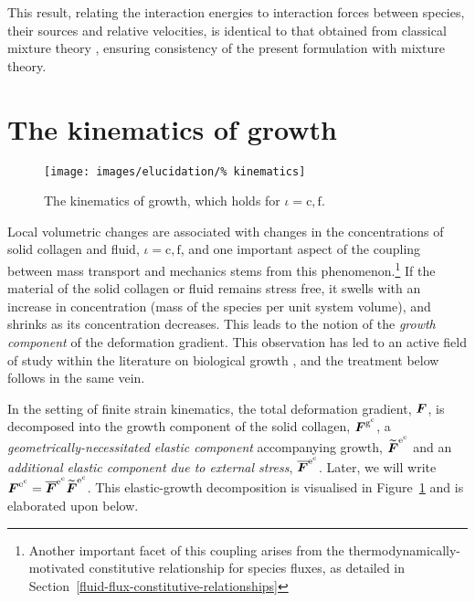 This result, relating the interaction energies to interaction
forces between species, their sources and relative velocities, is
identical to that obtained from classical mixture theory
\citep{TruesdellNoll:65}, ensuring consistency of the present
formulation with mixture theory.

\section{The kinematics of growth}
\label{kinematics-of-growth}

\begin{figure}[ht]
  \centering
  \texttt{[image: images/elucidation/\%
    kinematics]}
  \caption{The kinematics of growth, which holds for $\iota =
    \mathrm{c,f}$.} 
  \label{continuum-potato-growth-kinematics}
\end{figure}

Local volumetric changes are associated with changes in the
concentrations of solid collagen and fluid, $\iota = \mathrm{c,f}$,
and one important aspect of the coupling between mass transport and
mechanics stems from this phenomenon.\footnote{Another important facet
  of this coupling arises from the thermodynamically-motivated
  constitutive relationship for species fluxes, as detailed in
  Section~\ref{fluid-flux-constitutive-relationships}} If the material
of the solid collagen or fluid remains stress free, it swells with an
increase in concentration (mass of the species per unit system
volume), and shrinks as its concentration decreases. This leads to the
notion of the \emph{growth component} of the deformation
gradient. This observation has led to an active field of study within
the literature on biological growth \citep{Skalak:81, SkalakHoger:96,
  Klischetal:2001, TaberHumphrey:2001, LubardaHoger:02,
  AmbrosiMollica:2002}, and the treatment below follows in the same
vein.

In the setting of finite strain kinematics, the total deformation
gradient, $\mbox{\boldmath$ F$}$, is decomposed into the growth component of the solid
collagen, $\mbox{\boldmath$ F$}^{\mathrm{g}^\mathrm{c}}$, a
\emph{geometrically-necessitated elastic component} accompanying
growth, $\widetilde{\mbox{\boldmath$ F$}}^{\mathrm{e}^\mathrm{c}}$ and an
\emph{additional elastic component due to external stress},
$\overline{\mbox{\boldmath$ F$}}^{\mathrm{e}^\mathrm{c}}$. Later, we will write
$\mbox{\boldmath$ F$}^{\mathrm{e}^\mathrm{c}} = \overline{\mbox{\boldmath$ F$}}^{\mathrm{e}^\mathrm{c}}
\widetilde{\mbox{\boldmath$ F$}}^{\mathrm{e}^\mathrm{c}}$. This elastic-growth
decomposition is visualised in
Figure~\ref{continuum-potato-growth-kinematics} and is elaborated upon
below.

